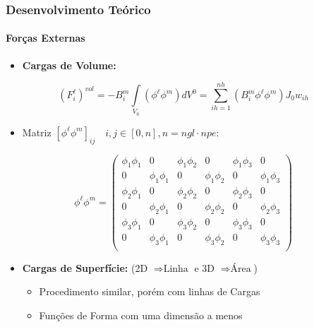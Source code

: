 \documentclass{beamer}
\begin{document}
\begin{frame}
    \frametitle{Desenvolvimento Teórico}
        \framesubtitle{Forças Externas} 

        \begin{itemize}
            \item \textbf{Cargas de Volume:} 
        \end{itemize}

        \begin{equation}
            (F^{\ell}_i)^{vol} = -B^m_i\int\limits_{V_0} \left(\phi^\ell \phi^m \right) dV^0 = \sum_{ih=1}^{nh} \left(B_i^m \phi^\ell \phi^m \right) J_0 w_{ih}
        \end{equation}

        \begin{itemize}
            \item Matriz \(\left[\phi^\ell \phi^m\right]_{ij}\quad i,j\in\left[0 , n \right] , n = ngl \cdot npe\):
        \end{itemize}

        \begin{equation}
            \phi^\ell \phi^m = 
            \begin{pmatrix}
                \phi_1 \phi_1 & 0 & \phi_1 \phi_2 & 0 & \phi_1 \phi_3 & 0  \\
                0 & \phi_1 \phi_1 & 0 & \phi_1 \phi_2 & 0 & \phi_1 \phi_3  \\
                \phi_2 \phi_1 & 0 & \phi_2 \phi_2 & 0 & \phi_2 \phi_3 & 0  \\
                0 & \phi_2 \phi_1 & 0 & \phi_2 \phi_2 & 0 & \phi_2 \phi_3  \\
                \phi_3 \phi_1 & 0 & \phi_3 \phi_2 & 0 & \phi_3 \phi_3 & 0  \\
                0 & \phi_3 \phi_1 & 0 & \phi_3 \phi_2 & 0 & \phi_3 \phi_3  \\
            \end{pmatrix}
        \end{equation}

        \begin{itemize}
            \item \textbf{Cargas de Superfície:} (2D \(\Rightarrow \text{Linha}\) e 3D \(\Rightarrow \text{Área}\))
            \begin{itemize}
                \item Procedimento similar, porém com linhas de Cargas
                \item Funções de Forma com uma dimensão a menos
            \end{itemize} 
        \end{itemize}

\end{frame}
\end{document}
